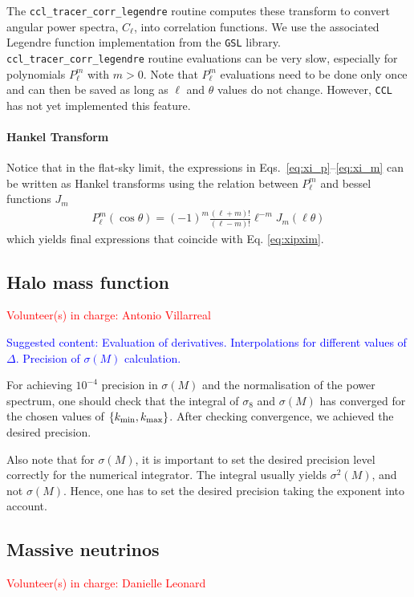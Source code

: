 \documentclass[\docopts]{\docclass}
\newcommand{\vol}[1]{\textcolor{red}{Volunteer(s) in charge: #1}}
\newcommand{\cont}[1]{\textcolor{blue}{Suggested content: #1}}
\newcommand{\ccl}{{\tt CCL}\xspace}
\begin{document}
The {\tt ccl\_tracer\_corr\_legendre} routine computes these transform to convert angular power spectra, $C_\ell$, into correlation functions. We use the associated Legendre function implementation from the {\tt GSL} library. {\tt ccl\_tracer\_corr\_legendre} routine evaluations can be very slow, especially for polynomials $P_\ell^m$ with $m>0$. Note that $P_\ell^m$ evaluations need to be done only once and can then be saved as long as $\ell$ and $\theta$ values do not change. However, \ccl has not yet implemented this feature.

\paragraph{Hankel Transform}
Notice that in the flat-sky limit, the expressions in Eqs.~\ref{eq:xi_p}--\ref{eq:xi_m} can be written as Hankel transforms using the relation between $P_{\ell}^m$ and bessel functions $J_m$
\begin{align}
  P_{\ell}^m(\cos\theta)=(-1)^m\frac{(\ell+m)!}{(\ell-m)!}\ell^{-m}J_m(\ell\theta)
\end{align}
which yields final expressions that coincide with Eq. \ref{eq:xipxim}.


\subsection{Halo mass function}
\vol{Antonio Villarreal}

\cont{Evaluation of derivatives. Interpolations for different values of $\Delta$. Precision of $\sigma(M)$ calculation.}

For achieving $10^{-4}$ precision in $\sigma(M)$ and the normalisation of the power spectrum, one should check that the integral of $\sigma_8$ and $\sigma(M)$ has converged for the chosen values of $\{k_{\rm min},k_{\rm max}\}$. After checking convergence, we achieved the desired precision.

Also note that for $\sigma(M)$, it is important to set the desired precision level correctly for the numerical integrator. The integral usually yields $\sigma^2(M)$, and not $\sigma(M)$. Hence, one has to set the desired precision taking the exponent into account.

\subsection{Massive neutrinos}
\vol{Danielle Leonard}
\end{document}
